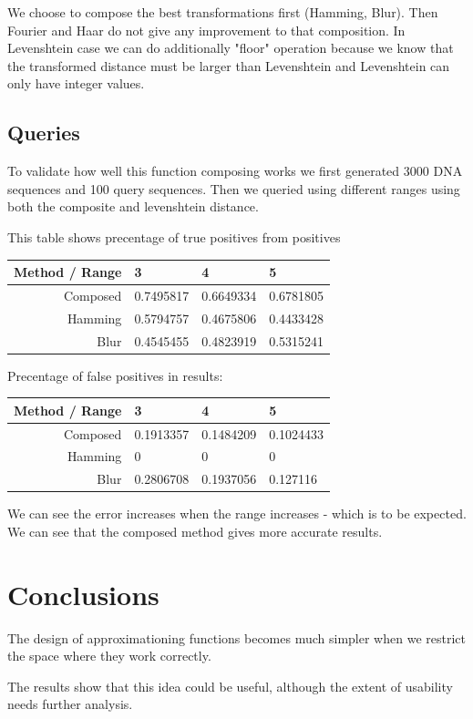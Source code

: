 \documentclass [12pt, a4]{article} %
\begin{document}
We choose to compose the best transformations first (Hamming, Blur). Then Fourier and Haar do not give any improvement to that composition. In Levenshtein case we can do additionally "floor" operation because we know that the transformed distance must be larger than Levenshtein and Levenshtein can only have integer values.

\subsection{Queries}

To validate how well this function composing works we first generated 3000 DNA sequences and 100 query sequences. Then we queried using different ranges using both the composite and levenshtein distance.

This table shows precentage of true positives from positives

\begin{table}[H]
\centering
\begin{tabular}{ r | l l l }
Method / Range & 3 & 4 & 5 \\ \hline
Composed & 0.7495817 & 0.6649334 & 0.6781805 \\
Hamming & 0.5794757 & 0.4675806 & 0.4433428 \\
Blur & 0.4545455 & 0.4823919 & 0.5315241 \\
\end{tabular}
\end{table}

Precentage of false positives in results:

\begin{table}[H]
\centering
\begin{tabular}{ r | l l l }
Method / Range & 3 & 4 & 5 \\ \hline
Composed & 0.1913357 & 0.1484209 & 0.1024433 \\
Hamming & 0        & 0        & 0         \\
Blur & 0.2806708 & 0.1937056 & 0.127116 \\
\end{tabular}
\end{table}

We can see the error increases when the range increases - which is to be expected.
We can see that the composed method gives more accurate results.

\section{Conclusions}

The design of approximationing functions becomes much simpler when we restrict the
space where they work correctly.

The results show that this idea could be useful, although the extent of usability
needs further analysis.

\nocite{*}


\end{document}

